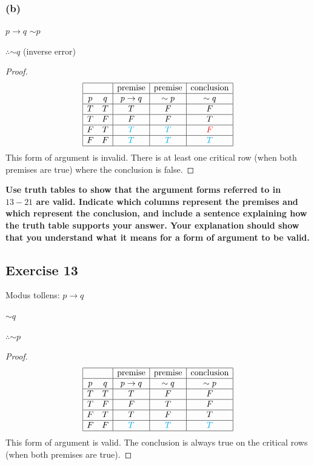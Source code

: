 \documentclass[14pt]{extarticle}
\begin{document}
\subsubsection{(b)} $p \to q$
${\sim p}$

$\therefore {\sim q}$ (inverse error)

\begin{proof} $$ \begin{array}{|cc|c|c|c|} \hline & & \text{premise} &
\text{premise} & \text{conclusion} \\ \hline p & q & p \to q & {\sim p} & {\sim
q} \\ \hline T & T & T & F & F \\ \hline T & F & F & F & T \\ \hline F & T &
\color{cyan} T & \color{cyan} T & \color{red} F \\ \hline F & F & \color{cyan} T
& \color{cyan} T & \color{cyan} T \\ \hline \end{array} $$ This form of argument
is invalid. There is at least one critical row (when both premises are true)
where the conclusion is false. \end{proof}

{\bf \color{cyan} Use truth tables to show that the argument forms referred to
in $13-21$ are valid. Indicate which columns represent the premises and which
represent the conclusion, and include a sentence explaining how the truth table
supports your answer. Your explanation should show that you understand what it
means for a form of argument to be valid.}

\subsection{Exercise 13} Modus tollens:
$p \to q$

${\sim q}$

$\therefore {\sim p}$

\begin{proof} $$ \begin{array}{|cc|c|c|c|} \hline & & \text{premise} &
\text{premise} & \text{conclusion} \\ \hline p & q & p \to q & {\sim q} & {\sim
p} \\ \hline T & T & T & F & F \\ \hline T & F & F & T & F \\ \hline F & T & T &
F & T \\ \hline F & F & \color{cyan} T & \color{cyan} T & \color{cyan} T \\
\hline \end{array} $$ This form of argument is valid. The conclusion is always
true on the critical rows (when both premises are true). \end{proof}
\end{document}
